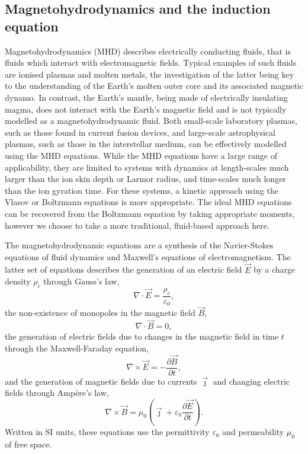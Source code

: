 \subsection{Magnetohydrodynamics and the induction equation}

Magnetohydrodynamics (MHD) describes electrically conducting fluids, that is fluids which interact with electromagnetic fields. Typical examples of such fluids are ionised plasmas and molten metals, the investigation of the latter being key to the understanding of the Earth's molten outer core and its associated magnetic dynamo. In contrast, the Earth's mantle, being made of electrically insulating magma, does not interact with the Earth's magnetic field and is not typically modelled as a magnetohydrodynamic fluid. Both small-scale laboratory plasmas, such as those found in current fusion devices, and large-scale astrophysical plasmas, such as those in the interstellar medium, can be effectively modelled using the MHD equations. While the MHD equations have a large range of applicability, they are limited to systems with dynamics at length-scales much larger than the ion skin depth or Larmor radius, and time-scales much longer than the ion gyration time. For these systems, a kinetic approach using the Vlasov or Boltzmann equations is more appropriate. The ideal MHD equations can be recovered from the Boltzmann equation by taking appropriate moments, however we choose to take a more traditional, fluid-based approach here.

The magnetohydrodynamic equations are a synthesis of the Navier-Stokes equations of fluid dynamics and Maxwell's equations of electromagnetism. The latter set of equations describes the generation of an electric field $\vec{E}$ by a charge density $\rho_c$ through Gauss's law,
\begin{equation}
  \label{eq:gauss_law}
 \nabla \cdot \vec {E} ={\frac {\rho_c }{\varepsilon _{0}}},
\end{equation}
the non-existence of monopoles in the magnetic field $\vec{B}$,
\begin{equation}
  \label{eq:gauss_law_for_magnetism}
  \nabla \cdot \vec {B} =0,
\end{equation}
the generation of electric fields due to changes in the magnetic field in time $t$ through the Maxwell-Faraday equation,
\begin{equation}
  \label{eq:maxwell_faraday}
 \nabla \times \vec {E} =-{\frac {\partial \vec {B} }{\partial t}},
\end{equation}
and the generation of magnetic fields due to currents $\vec{\jmath}$ and changing electric fields through Ampère's law,
\begin{equation}
  \label{eq:ampere_law}
 \nabla \times \vec {B} =\mu _{0}\left(\vec {\jmath} +\varepsilon _{0}{\frac {\partial \vec {E} }{\partial t}}\right).
\end{equation}
Written in SI units, these equations use the permittivity $\varepsilon_{0}$ and permeability $\mu_0$ of free space.

